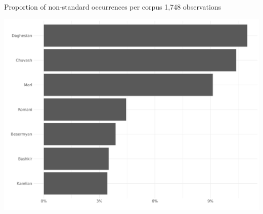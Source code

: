 \documentclass[
  ignorenonframetext,
  t]{beamer}
\begin{document}
\begin{frame}{Proportion of non-standard occurrences per corpus}
\label{proportion-of-non-standard-occurrences-per-corpus}
1,748 observations

\begin{center}
\includegraphics[width=12in,height=0.84\textheight]{images/l2_num_constr_distribution_of_nstd_forms_without_fully_std_speakers.png}
\end{center}
\end{frame}
\end{document}
